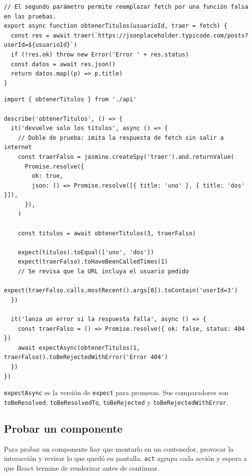 \documentclass[11pt,a4paper]{article}
\newcommand{\cmd}[1]{\texttt{\color{reactdark}#1}}
\begin{document}
\begin{lstlisting}[language=JSX,title={\small\ttfamily src/logica/api.js}]
// El segundo parámetro permite reemplazar fetch por una función falsa en las pruebas.
export async function obtenerTitulos(usuarioId, traer = fetch) {
  const res = await traer(`https://jsonplaceholder.typicode.com/posts?userId=${usuarioId}`)
  if (!res.ok) throw new Error('Error ' + res.status)
  const datos = await res.json()
  return datos.map((p) => p.title)
}
\end{lstlisting}
\begin{lstlisting}[language=JSX,title={\small\ttfamily src/logica/api.spec.js}]
import { obtenerTitulos } from './api'

describe('obtenerTitulos', () => {
  it('devuelve solo los títulos', async () => {
    // Doble de prueba: imita la respuesta de fetch sin salir a internet
    const traerFalso = jasmine.createSpy('traer').and.returnValue(
      Promise.resolve({
        ok: true,
        json: () => Promise.resolve([{ title: 'uno' }, { title: 'dos' }]),
      }),
    )

    const titulos = await obtenerTitulos(3, traerFalso)

    expect(titulos).toEqual(['uno', 'dos'])
    expect(traerFalso).toHaveBeenCalledTimes(1)
    // Se revisa que la URL incluya el usuario pedido
    expect(traerFalso.calls.mostRecent().args[0]).toContain('userId=3')
  })

  it('lanza un error si la respuesta falla', async () => {
    const traerFalso = () => Promise.resolve({ ok: false, status: 404 })
    await expectAsync(obtenerTitulos(1, traerFalso)).toBeRejectedWithError('Error 404')
  })
})
\end{lstlisting}

\cmd{expectAsync} es la versión de \cmd{expect} para promesas. Sus comparadores son \cmd{toBeResolved}, \cmd{toBeResolvedTo}, \cmd{toBeRejected} y \cmd{toBeRejectedWithError}.

\subsection{Probar un componente}

Para probar un componente hay que montarlo en un contenedor, provocar la interacción y revisar lo que quedó en pantalla. \cmd{act} agrupa cada acción y espera a que React termine de renderizar antes de continuar.
\end{document}
